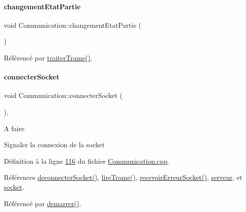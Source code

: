 \paragraph{\texorpdfstring{changement\+Etat\+Partie}{changementEtatPartie}}
{\footnotesize\ttfamily void Communication\+::changement\+Etat\+Partie (\begin{DoxyParamCaption}{ }\end{DoxyParamCaption})\hspace{0.3cm}{\ttfamily [signal]}}



Référencé par \hyperlink{_communication_8cpp_source_l00208}{traiter\+Trame()}.

\mbox{\label{class_communication_a1ef7e4107d98346290f19f76d7eecf32}} 
\paragraph{\texorpdfstring{connecter\+Socket}{connecterSocket}}
{\footnotesize\ttfamily void Communication\+::connecter\+Socket (\begin{DoxyParamCaption}{ }\end{DoxyParamCaption})\hspace{0.3cm}{\ttfamily [private]}, {\ttfamily [slot]}}

\begin{DoxyRefDesc}{A faire}
\item[\hyperlink{todo__todo000001}{A faire}]Signaler la connexion de la socket \end{DoxyRefDesc}


Définition à la ligne \hyperlink{_communication_8cpp_source_l00116}{116} du fichier \hyperlink{_communication_8cpp_source}{Communication.\+cpp}.



Références \hyperlink{_communication_8cpp_source_l00133}{deconnecter\+Socket()}, \hyperlink{_communication_8cpp_source_l00173}{lire\+Trame()}, \hyperlink{_communication_8cpp_source_l00142}{recevoir\+Erreur\+Socket()}, \hyperlink{_communication_8h_source_l00051}{serveur}, et \hyperlink{_communication_8h_source_l00052}{socket}.



Référencé par \hyperlink{_communication_8cpp_source_l00073}{demarrer()}.


